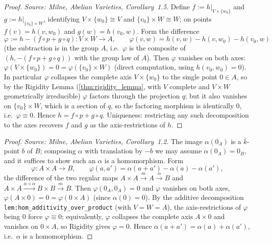\begin{proof}
  \leanok
  \textit{Source: Milne, Abelian Varieties, Corollary~1.5.}
  Define \(f := h|_{V \times \{w_0\}}\) and \(g := h|_{\{v_0\} \times W}\), identifying
  \(V \times \{w_0\} \cong V\) and \(\{v_0\} \times W \cong W\); on points \(f(v) = h(v, w_0)\) and
  \(g(w) = h(v_0, w)\). Form the difference
  \[ \varphi := h - (f \circ p + g \circ q) \colon V \times W \to A, \qquad
     \varphi(v, w) = h(v, w) - h(v, w_0) - h(v_0, w) \]
  (the subtraction is in the group \(A\), i.e.\ \(\varphi\) is the composite of
  \((h, -(f \circ p + g \circ q))\) with the group law of \(A\)). Then \(\varphi\) vanishes on both
  axes: \(\varphi(V \times \{w_0\}) = 0 = \varphi(\{v_0\} \times W)\) (direct computation, using
  \(h(v_0, w_0) = 0\)). In particular \(\varphi\) collapses the complete axis \(V \times \{w_0\}\) to
  the single point \(0 \in A\), so by the Rigidity Lemma (\cref{thm:rigidity_lemma}, with \(V\)
  complete and \(V \times W\) geometrically irreducible) \(\varphi\) factors through the projection
  \(q\); but it also vanishes on \(\{v_0\} \times W\), which is a section of \(q\), so the factoring
  morphism is identically \(0\), i.e.\ \(\varphi \equiv 0\). Hence \(h = f \circ p + g \circ q\).
  Uniqueness: restricting any such decomposition to the axes recovers \(f\) and \(g\) as the
  axis-restrictions of \(h\).
\end{proof}
\begin{proof}
  \leanok
  \textit{Source: Milne, Abelian Varieties, Corollary~1.2.}
  The image \(\alpha(0_A)\) is a \(\bar k\)-point \(b\) of \(B\); composing \(\alpha\) with translation by
  \(-b\) we may assume \(\alpha(0_A) = 0_B\), and it suffices to show such an \(\alpha\) is a
  homomorphism. Form
  \[ \varphi \colon A \times A \to B, \qquad \varphi(a, a') = \alpha(a + a') - \alpha(a) - \alpha(a'), \]
  the difference of the two regular maps \(A \times A \xrightarrow{m} A \xrightarrow{\alpha} B\)
  and \(A \times A \xrightarrow{\alpha \times \alpha} B \times B \xrightarrow{m} B\). Then
  \(\varphi(0_A, 0_A) = 0\) and \(\varphi\) vanishes on both axes,
  \(\varphi(A \times 0) = 0 = \varphi(0 \times A)\) (since \(\alpha(0) = 0\)). By the additive
  decomposition \texttt{lem:hom_additivity_over_product} (with \(V = W = A\)), the axis-restrictions
  of \(\varphi\) being \(0\) force \(\varphi \equiv 0\); equivalently, \(\varphi\) collapses the complete
  axis \(A \times 0\) and vanishes on \(0 \times A\), so Rigidity gives \(\varphi = 0\). Hence
  \(\alpha(a + a') = \alpha(a) + \alpha(a')\), i.e.\ \(\alpha\) is a homomorphism.
\end{proof}
